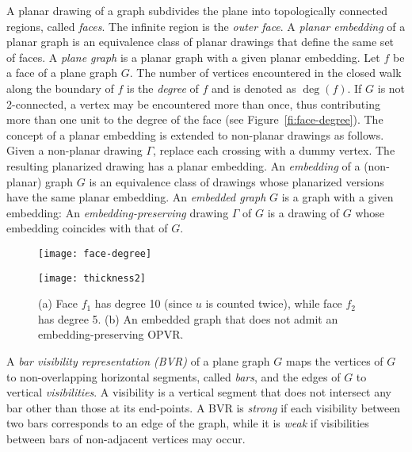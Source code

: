 \documentclass{article}
\newcommand{\opvr}{OPVR\xspace}
\begin{document}
A planar drawing of a graph subdivides the plane into topologically connected regions, called \emph{faces}. The infinite region is the \emph{outer face}. A \emph{planar embedding} of a planar graph is an equivalence class of planar drawings that define the same set of faces. A \emph{plane graph} is a planar graph with a given planar embedding. Let $f$ be a face of a plane graph $G$. The number of vertices encountered in the closed walk along the boundary of $f$ is the \emph{degree} of $f$ and is denoted as $\deg(f)$. If $G$ is not 2-connected, a vertex may be encountered more than once, thus contributing  more than one unit to the degree of the face (see Figure~\ref{fi:face-degree}).  
The concept of a planar embedding is extended to non-planar drawings as follows. Given a non-planar drawing $\Gamma$, replace each crossing with a dummy vertex. The resulting planarized drawing has a planar embedding. An \emph{embedding} of a (non-planar) graph $G$ is an equivalence class of  drawings whose planarized versions have the same planar embedding.
An \emph{embedded graph} $G$ is a graph with a given embedding: An \emph{embedding-preserving} drawing $\Gamma$ of $G$ is a drawing of $G$ whose embedding coincides with that of $G$.


\begin{figure}[tb]
    \centering
    \begin{minipage}[b]{.3\textwidth}
    	\centering
    	\texttt{[image: face-degree]}
    	\subcaption{}\label{fi:face-degree}
    \end{minipage}
    \hfil
    \begin{minipage}[b]{.3\textwidth}
    	\centering
    	\texttt{[image: thickness2]}
    	\subcaption{}\label{fi:thickness2}
    \end{minipage}
    \caption{ (a) Face $f_1$ has degree 10 (since $u$ is counted twice), while face $f_2$ has degree 5. (b) An embedded graph that does not admit an embedding-preserving \opvr.}
\end{figure} 

A \emph{bar visibility representation (BVR)} of a plane graph $G$ maps the vertices of $G$ to non-overlapping horizontal segments, called \emph{bars}, and the edges of $G$ to vertical \emph{visibilities}.  A visibility is a vertical segment that does not intersect any bar other than those at its end-points. A BVR is \emph{strong} if each visibility between two bars corresponds to an edge of the graph, while it is \emph{weak} if visibilities between bars of non-adjacent vertices may occur. 
\end{document}
